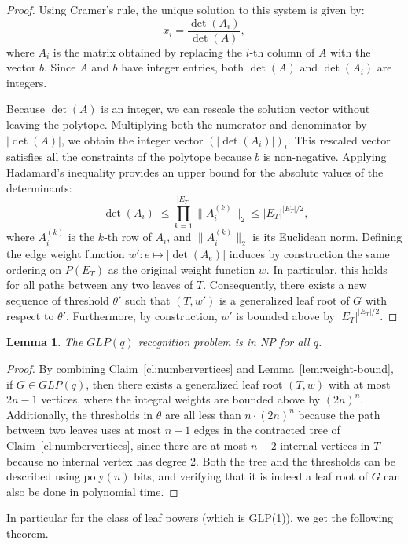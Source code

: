 \documentclass[11pt, letter]{article}
\newtheorem{lemma}[theorem]{Lemma}
\theoremstyle{remark}
\begin{document}
\begin{proof}
Using Cramer's rule, the unique solution to this system is given by:
$$
x_i = \frac{\det(A_i)}{\det(A)},
$$
where $ A_i $ is the matrix obtained by replacing the $ i $-th column of $ A $ with the vector $ b $. Since $ A $ and $ b $ have integer entries, both $ \det(A) $ and $ \det(A_i) $ are integers.

Because $ \det(A) $ is an integer, we can rescale the solution vector without leaving the polytope. Multiplying both the numerator and denominator by $ |\det(A)| $, we obtain the integer vector $ (|\det(A_i)|)_i $. This rescaled vector satisfies all the constraints of the polytope because $b$ is non-negative. Applying Hadamard's inequality provides an upper bound for the absolute values of the determinants:
$$
|\det(A_i)| \leq \prod_{k=1}^{|E_T|} \|A_i^{(k)}\|_2 \leq |E_T|^{|E_T|/2},
$$
where $ A_i^{(k)} $ is the $ k $-th row of $ A_i $, and $ \|A_i^{(k)}\|_2 $ is its Euclidean norm. Defining the edge weight function $ w' : e \mapsto |\det(A_e)| $ induces by construction the same ordering on $ P(E_T) $ as the original weight function $ w $. In particular, this holds for all paths between any two leaves of $ T $. Consequently, there exists a new sequence of threshold $ \theta' $ such that $ (T, w') $ is a generalized leaf root of $ G $ with respect to $ \theta' $. Furthermore, by construction, $ w' $ is bounded above by $ |E_T|^{|E_T|/2} $.
\end{proof}

\begin{lemma}\label{lem:NP}
    The $GLP(q)$ recognition problem is in NP for all $q$.
\end{lemma}

\begin{proof}
By combining Claim~\ref{cl:numbervertices} and Lemma~\ref{lem:weight-bound}, if $G \in GLP(q)$, then there exists a generalized leaf root $(T, w)$ with at most $2n - 1$ vertices, where the integral weights are bounded above by $(2n)^n$. Additionally, the thresholds in $\theta$ are all less than $n \cdot (2n)^n$ because the path between two leaves uses at most $n-1$ edges in the contracted tree of Claim~\ref{cl:numbervertices}, since there are at most $n-2$ internal vertices in $T$ because no internal vertex has degree 2. Both the tree and the thresholds can be described using $\text{poly}(n)$ bits, and verifying that it is indeed a leaf root of $G$ can also be done in polynomial time.
\end{proof}

In particular for the class of leaf powers (which is GLP(1)), we get the following theorem.
\end{document}
